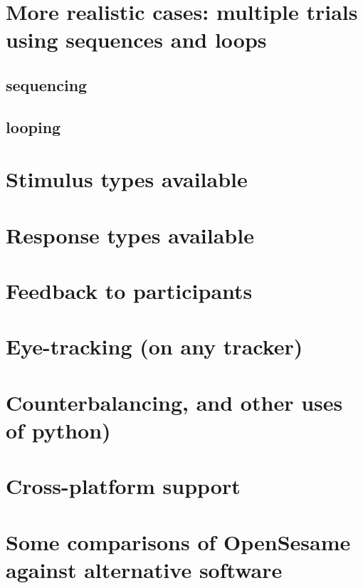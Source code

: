 \documentclass[a4paper]{tufte-handout}
\begin{document}
\section{More realistic cases: multiple trials using sequences and loops}
\subsection{sequencing}
\subsection{looping}

\section{Stimulus types available}

\section{Response types available}

\section{Feedback to participants}

\section{Eye-tracking (on any tracker)}

\section{Counterbalancing, and other uses of python)}

\section{Cross-platform support}

\section{Some comparisons of OpenSesame against alternative software}

%
\end{document}
